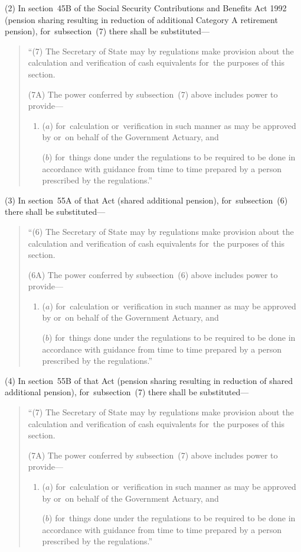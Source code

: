 \documentclass[12pt,a4paper]{article}
\begin{document}
(2) In section~45B of the Social Security Contributions and Benefits Act 1992 (pension sharing resulting in reduction of additional Category A retirement pension), for~subsection~(7)  there shall be substituted—
\begin{quotation}
“(7) The Secretary of State may by regulations make provision about the calculation and verification of cash equivalents for~the purposes of this section.

(7A) The power conferred by subsection~(7)  above includes power to provide—
\begin{enumerate}\item[]
($a$) for~calculation or~verification in such manner as may be approved by or~on behalf of the Government Actuary, and

($b$) for~things done under the regulations to be required to be done in accordance with guidance from time to time prepared by a person prescribed by the regulations.”
\end{enumerate}
\end{quotation}

(3) In section~55A of that Act (shared additional pension), for~subsection~(6)  there shall be substituted—
\begin{quotation}
“(6) The Secretary of State may by regulations make provision about the calculation and verification of cash equivalents for~the purposes of this section.

(6A) The power conferred by subsection~(6)  above includes power to provide—
\begin{enumerate}\item[]
($a$) for~calculation or~verification in such manner as may be approved by or~on behalf of the Government Actuary, and

($b$) for~things done under the regulations to be required to be done in accordance with guidance from time to time prepared by a person prescribed by the regulations.”
\end{enumerate}
\end{quotation}

(4) In section~55B of that Act (pension sharing resulting in reduction of shared additional pension), for~subsection~(7)  there shall be substituted—
\begin{quotation}
“(7) The Secretary of State may by regulations make provision about the calculation and verification of cash equivalents for~the purposes of this section.

(7A) The power conferred by subsection~(7)  above includes power to provide—
\begin{enumerate}\item[]
($a$) for~calculation or~verification in such manner as may be approved by or~on behalf of the Government Actuary, and

($b$) for~things done under the regulations to be required to be done in accordance with guidance from time to time prepared by a person prescribed by the regulations.”
\end{enumerate}
\end{quotation}
\end{document}
